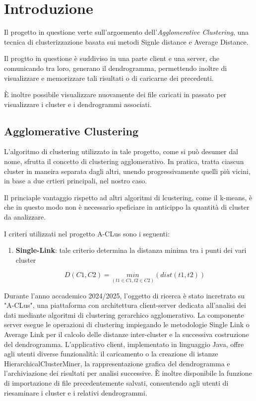 \section{Introduzione}

Il progetto in questione verte sull'argoemento dell'\textit{Agglomerative Clustering}, una tecnica di clusterizzazione basata sui metodi Signle distance e Average Distance. 

Il progtto in questione è suddiviso in una parte client e una server, che comunicando tra loro, generano il dendrogramma, permettendo inoltre di visualizzare e memorizzare tali risultati o di caricarne dei precedenti.

È inoltre possibile visualizzare nuovamente dei file caricati in passato per visualizzare i cluster e i dendrogrammi associati. 


\subsection{Agglomerative Clustering}

L'algoritmo di clustering utilizzato in tale progetto, come si può desumer dal nome, sfrutta il concetto di clustering agglomerativo. In pratica, tratta ciascun cluster in maneira separata dagli altri, unendo progressivamente quelli più vicini, in base a due crtieri principali, nel nostro caso.

Il princiaple vantaggio  rispetto ad altri algoritmi di lcustering, come il k-means, è che in questo modo non è necessario speficiare in anticippo la quantità di cluster da analizzare. 

I criteri utilizzati nel progetto A-CLus sono i seguenti: 

\begin{enumerate}
    \item \textbf{Single-Link}: tale criterio determina la distanza minima tra i punti dei vari cluster

    \begin{equation}
        D\left(C1,C2\right) = \underset{\left(t1 \in C1,t2 \in C2\right)}{min}\left( dist\left(t1,t2\right)\right)
    \end{equation}
\end{enumerate}


Durante l'anno accademico 2024/2025, l'oggetto di ricerca è stato incretrato su "A-CLus", una piattaforma con architettura client-server dedicata all'analisi dei dati mediante algoritmi di clustering gerarchico agglomerativo. La componente server esegue le operazioni di clustering impiegando le metodologie Single Link o Average Link per il calcolo delle distanze inter-cluster e la successiva costruzione del dendrogramma. L'applicativo client, implementato in linguaggio Java, offre agli utenti diverse funzionalità: il caricamento o la creazione di istanze HierarchicalClusterMiner, la rappresentazione grafica del dendrogramma e l'archiviazione dei risultati per analisi successive. È inoltre disponibile la funzione di importazione di file precedentemente salvati, consentendo agli utenti di riesaminare i cluster e i relativi dendrogrammi. 

